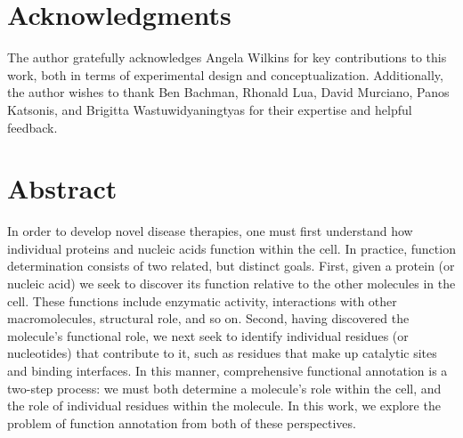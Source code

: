 \documentclass[12pt,a4paper]{report}
\makeatletter
\newcommand*{\toccontents}{\@starttoc{toc}} %
\makeatother
\begin{document}


\chapter*{\Large Acknowledgments}
The author gratefully acknowledges Angela Wilkins for key contributions to this work, both in terms of experimental design and conceptualization. Additionally, the author wishes to thank Ben Bachman, Rhonald Lua, David Murciano, Panos Katsonis, and Brigitta Wastuwidyaningtyas for their expertise and helpful feedback.

\chapter*{\Large Abstract}


In order to develop novel disease therapies, one must first understand how individual proteins and nucleic acids function within the cell. In practice, function determination consists of two related, but distinct goals. First, given a protein (or nucleic acid) we seek to discover its function relative to the other molecules in the cell. These functions include enzymatic activity, interactions with other macromolecules, structural role, and so on. Second, having discovered the molecule's functional role, we next seek to identify individual residues (or nucleotides) that contribute to it, such as residues that make up catalytic sites and binding interfaces. In this manner, comprehensive functional annotation is a two-step process: we must both determine a molecule's role within the cell, and the role of individual residues within the molecule. In this work, we explore the problem of function annotation from both of these perspectives.
\end{document}
